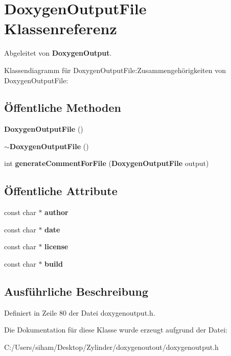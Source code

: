 \section{Doxygen\-Output\-File Klassenreferenz}
\label{class_doxygen_output_file}
Abgeleitet von {\bf Doxygen\-Output}.

Klassendiagramm f\"{u}r Doxygen\-Output\-File:Zusammengeh\"{o}rigkeiten von Doxygen\-Output\-File:\subsection*{\"{O}ffentliche Methoden}
\begin{CompactItemize}
\item 
{\bf Doxygen\-Output\-File} ()\label{class_doxygen_output_file_43d1137b25ed2446c35176024cc9ed72}

\item 
{\bf $\sim$Doxygen\-Output\-File} ()\label{class_doxygen_output_file_35f6b9d4e558c4e0350578ca9a5cde6e}

\item 
int {\bf generate\-Comment\-For\-File} ({\bf Doxygen\-Output\-File} output)\label{class_doxygen_output_file_bf481e9441a8e505417d34fd66bd7f0e}

\end{CompactItemize}
\subsection*{\"{O}ffentliche Attribute}
\begin{CompactItemize}
\item 
const char $\ast$ {\bf author}\label{class_doxygen_output_file_02bd92faa38aaa6cc0ea75e59937a1ef}

\item 
const char $\ast$ {\bf date}\label{class_doxygen_output_file_5fc732311905cb27e82d67f4f6511f7f}

\item 
const char $\ast$ {\bf license}\label{class_doxygen_output_file_718779752b851ac0dc6281a8c8d77e7e}

\item 
const char $\ast$ {\bf build}\label{class_doxygen_output_file_b0da275520918e23dd615e2a747528f1}

\end{CompactItemize}


\subsection{Ausf\"{u}hrliche Beschreibung}




Definiert in Zeile 80 der Datei doxygenoutput.h.

Die Dokumentation f\"{u}r diese Klasse wurde erzeugt aufgrund der Datei:\begin{CompactItemize}
\item 
C:/Users/siham/Desktop/Zylinder/doxygenoutout/doxygenoutput.h\end{CompactItemize}
